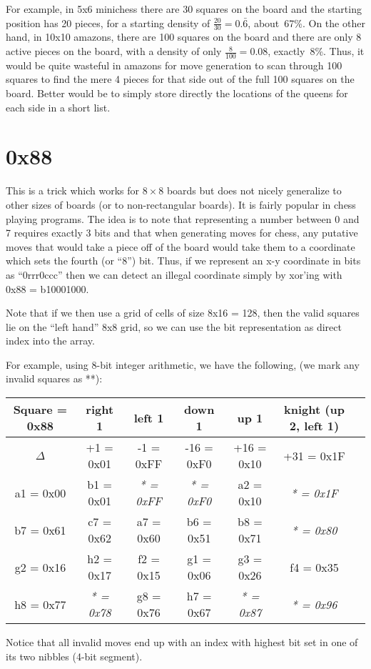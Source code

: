 \documentclass[10pt,dvipdfmx]{report}
\let\x=\times
\begin{document}
For example, in 5x6 minichess there are 30 squares on the board and the starting position has
20 pieces, for a starting density of $\frac{20}{30} = 0.\bar6$, about~67\%.
On the other hand, in 10x10 amazons, there are 100 squares on the board and there are
only 8 active pieces on the board, with a density of only $\frac{8}{100} = 0.08$, exactly~8\%.
Thus, it would be quite wasteful in amazons for move generation to scan through 100 squares to find the
mere 4 pieces for that side out of the full 100 squares on the board.  Better would be to simply
store directly the locations of the queens for each side in a short list.

\section{0x88}
This is a trick which works for $8\x8$ boards but does not
nicely generalize to other sizes of boards (or to non-rectangular boards).
It is fairly popular in chess playing programs.
The idea is to note that representing a number between 0 and 7 requires exactly 3 bits
and that when generating moves for chess, any putative moves that would take a piece off
of the board would take them to a coordinate which sets the fourth (or ``8'') bit.
Thus, if we represent an x-y coordinate in bits as ``0rrr0ccc'' then we can detect an
illegal coordinate simply by xor'ing with 0x88 = b10001000.

Note that if we then use a grid of cells of size 8x16 = 128, then the valid squares lie on
the ``left hand'' 8x8 grid, so we can use the bit representation as direct index into the array.

For example, using 8-bit integer arithmetic, we have the following, (we mark any invalid squares as **):
\begin{center}\begin{tabular}{c|cccccc}
Square = 0x88 & right 1     & left 1    & down 1      & up 1       & knight (up 2, left 1) \\\hline\hline
$\Delta$      &  +1 = 0x01   &  -1 = 0xFF & -16 = 0xF0  & +16 = 0x10 & +31 = 0x1F            \\\hline
a1 = 0x00     &  b1 = 0x01   &\it ** = 0xFF &\it ** = 0xF0  &  a2 = 0x10 &\it ** = 0x1F            \\
b7 = 0x61     &  c7 = 0x62   &  a7 = 0x60 &  b6 = 0x51  &  b8 = 0x71 &\it ** = 0x80            \\
g2 = 0x16     &  h2 = 0x17   &  f2 = 0x15 &  g1 = 0x06  &  g3 = 0x26 &  f4 = 0x35            \\
h8 = 0x77     &\it ** = 0x78   &  g8 = 0x76 &  h7 = 0x67  &\it ** = 0x87 &\it ** = 0x96            \\
\end{tabular}\end{center}
Notice that all invalid moves end up with an index with highest bit set in one of its two nibbles (4-bit segment).
\end{document}
